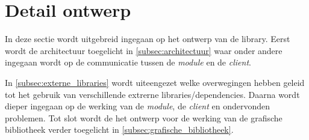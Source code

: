 \section{Detail ontwerp} \label{sec:detail}

In deze sectie wordt uitgebreid ingegaan op het ontwerp van de library. Eerst wordt de architectuur toegelicht in \autoref{subsec:architectuur} waar onder andere ingegaan wordt op de communicatie tussen de \emph{module} en de \emph{client}.

In \autoref{subsec:externe_libraries} wordt uiteengezet welke overwegingen hebben geleid tot het gebruik van verschillende extrerne libraries/dependencies. Daarna wordt dieper ingegaan op de werking van de \emph{module}, de \emph{client} en ondervonden problemen. Tot slot wordt de het ontwerp voor de werking van de grafische bibliotheek verder toegelicht in \autoref{subsec:grafische_bibliotheek}.






